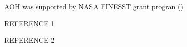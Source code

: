 \documentclass[tc, manuscript]{copernicus}
\begin{document}

\begin{acknowledgements}
AOH was supported by NASA FINESST grant progran ()
\end{acknowledgements}






\begin{thebibliography}{}

REFERENCE 1

REFERENCE 2

\end{thebibliography}










\end{document}
